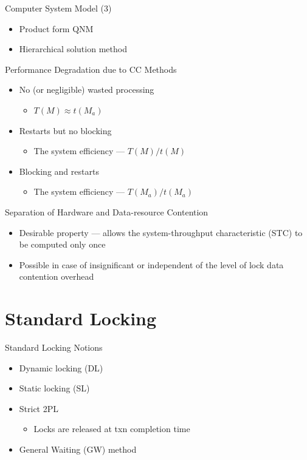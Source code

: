 \documentclass[sans]{beamer}
\begin{document}
\begin{frame}{Computer System Model (3)}
  \begin{itemize}
    \item Product form QNM
    \item Hierarchical solution method
  \end{itemize}
\end{frame}

\begin{frame}{Performance Degradation due to CC Methods}
  \begin{itemize}
    \item No (or negligible) wasted processing
      \begin{itemize}
        \item $T(M) \approx t(M_a)$
      \end{itemize}
    \item Restarts but no blocking
      \begin{itemize}
        \item The system efficiency --- $T(M) / t(M)$
      \end{itemize}
    \item Blocking and restarts
      \begin{itemize}
        \item The system efficiency --- $T(M_a) / t(M_a)$
      \end{itemize}
  \end{itemize}
\end{frame}

\begin{frame}{Separation of Hardware and Data-resource Contention}
  \begin{itemize}
    \item Desirable property --- allows the system-throughput 
      characteristic (STC) to be computed only once
    \item Possible in case of insignificant or independent of
      the level of lock data contention overhead
  \end{itemize}
\end{frame}

\section{Standard Locking}

\begin{frame}{Standard Locking Notions}
  \begin{itemize}
    \item Dynamic locking (DL)
    \item Static locking (SL)
    \item Strict 2PL
      \begin{itemize}
        \item Locks are released at txn completion time 
      \end{itemize}
    \item General Waiting (GW) method
  \end{itemize}
\end{frame}
\end{document}
